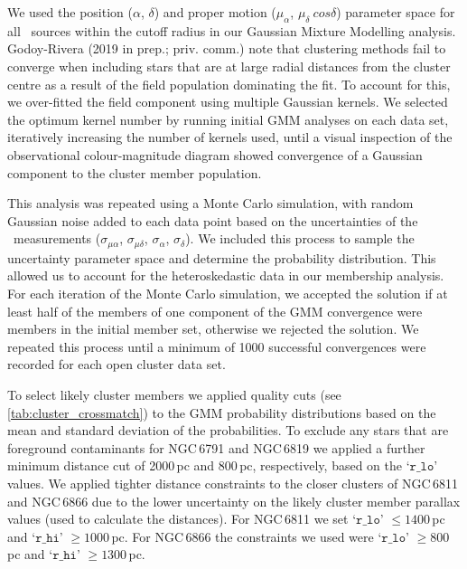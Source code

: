 
We used the position ($\alpha$, $\delta$) and proper motion ($\mu_{\alpha}$, $\mu_{\delta}~cos\delta$) parameter space for all \Gaia~sources within the cutoff radius in our Gaussian Mixture Modelling analysis. %
Godoy-Rivera (2019 in prep.; priv. comm.) note that clustering methods fail to converge when including stars that are at large radial distances from the cluster centre as a result of the field population dominating the fit. To account for this, we over-fitted the field component using multiple Gaussian kernels. We selected the optimum kernel number by running initial GMM analyses on each data set, iteratively increasing the number of kernels used, until a visual inspection of the observational colour-magnitude diagram showed convergence of a Gaussian component to the cluster member population. 

This analysis was repeated using a Monte Carlo simulation, with random Gaussian noise added to each data point based on the uncertainties of the \Gaia~measurements ($\sigma_{\mu\alpha}$, $\sigma_{\mu\delta}$, $\sigma_{\alpha}$, $\sigma_{\delta}$). We included this process to sample the uncertainty parameter space and determine the probability distribution. This allowed us to account for the heteroskedastic data in our membership analysis. For each iteration of the Monte Carlo simulation, we accepted the solution if at least half of the members of one component of the GMM convergence were members in the initial member set, otherwise we rejected the solution. We repeated this process until a minimum of 1000 successful convergences were recorded for each open cluster data set.

To select likely cluster members we applied quality cuts (see \cref{tab:cluster_crossmatch}) to the GMM probability distributions based on the mean and standard deviation of the probabilities. To exclude any stars that are foreground contaminants for NGC\,6791 and NGC\,6819 we applied a further minimum distance cut of 2000\,pc and 800\,pc, respectively, based on the \cite{bailer-jones_estimating_2018} `$\texttt{r\_lo}$' values. We applied tighter distance constraints to the closer clusters of NGC\,6811 and NGC\,6866 due to the lower uncertainty on the likely cluster member parallax values (used to calculate the distances). For NGC\,6811 we set `$\texttt{r\_lo}$' $\leq 1400$\,pc and `$\texttt{r\_hi}$' $\geq 1000$\,pc. For NGC\,6866 the constraints we used were `$\texttt{r\_lo}$' $\geq 800$\,pc and `$\texttt{r\_hi}$' $\geq 1300$\,pc.

